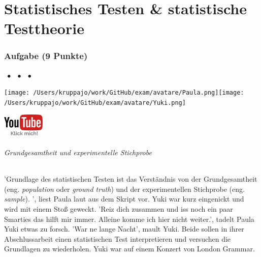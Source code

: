 \documentclass[a4paper, 9pt]{scrartcl}\usepackage[]{graphicx}\usepackage[]{xcolor}
\begin{document}
\part{Statistisches Testen \& statistische Testtheorie}

\section{Aufgabe \hfill (9 Punkte)}


 
\ifcollection
\begin{flushright}
\tiny
\textbf{\examinhaltstart}
\exammodulestat $\;\bullet$
\exammodulestatbbv $\;\bullet$
\exammodulestatversuch $\;\bullet$
\exammodulebiostat
\vspace{-4Ex}
\end{flushright}
\begin{minipage}[t]{0.5\textwidth}
\texttt{[image: /Users/kruppajo/work/GitHub/exam/avatare/Paula.png]}\hspace{-4mm}\texttt{[image: /Users/kruppajo/work/GitHub/exam/avatare/Yuki.png]}
\end{minipage}
\begin{minipage}[t]{0.5\textwidth}
\hfill
\href{https://youtu.be/aHVYuFKTqZs}{\includegraphics[width = 2cm]{img/youtube}}
\end{minipage}
\fi



\ifcollection
\paragraph{Grundgesamtheit und experimentelle Stichprobe}
\fi

'Grundlage des statistischen Testen ist das Verständnis von der Grundgesamtheit (eng. \textit{population} oder \textit{ground truth}) und der experimentellen Stichprobe (eng. \textit{sample}). ', liest Paula laut aus dem Skript vor. Yuki war kurz eingenickt und wird mit einem Stoß geweckt. 'Reiz dich zusammen und iss noch ein paar Smarties das hilft mir immer. Alleine komme ich hier nicht weiter.', tadelt Paula Yuki etwas zu forsch. 'War ne lange Nacht', mault Yuki. Beide sollen in ihrer Abschlussarbeit einen statistischen Test interpretieren und versuchen die Grundlagen zu wiederholen. Yuki war auf einem Konzert von London Grammar.
\end{document}
